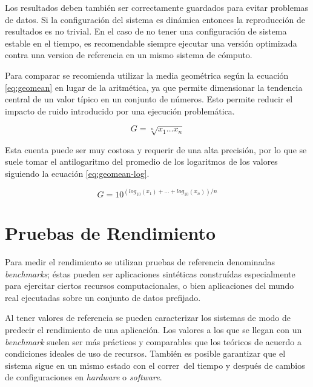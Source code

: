 \documentclass[a4paper]{report}
\begin{document}
Los resultados deben tambi\'en ser correctamente guardados para evitar
problemas de datos. Si la configuraci\'on del sistema es din\'amica entonces la
reproducci\'on de resultados es no trivial. En el caso de no tener una
configuraci\'on de sistema estable en el tiempo, es recomendable siempre
ejecutar una versi\'on optimizada contra una version de referencia en un mismo
sistema de c\'omputo.

\bigskip

Para comparar se recomienda utilizar la media geom\'etrica seg\'un la ecuaci\'on \ref{eq:geomean} en lugar de la aritm\'etica, ya que permite dimensionar la tendencia central de un valor t\'ipico en un conjunto
de n\'umeros. Esto permite reducir el impacto de ruido introducido por una ejecuci\'on
problem\'atica.

\begin{equation}
\label{eq:geomean}
G = \sqrt[n]{x_{1} \ldots x_{n}}
\end{equation}

Esta cuenta puede ser muy costosa y requerir de una alta precisi\'on, por lo que se
suele tomar el antilogaritmo del promedio de los logaritmos de los valores siguiendo
la ecuaci\'on \ref{eq:geomean-log}.

\begin{equation}
\label{eq:geomean-log}
G = 10 ^{( log _{10} (x_{1}) + \ldots + log _{10} (x_{n}) ) / n}
\end{equation}

\bigskip

\section{Pruebas de Rendimiento}

Para medir el rendimiento se utilizan pruebas de referencia denominadas {\em benchmarks}; \'estas pueden ser aplicaciones sint\'eticas constru\'idas especialmente para ejercitar ciertos recursos computacionales, o bien
aplicaciones del mundo real ejecutadas sobre un conjunto de datos prefijado.

\bigskip

Al tener valores de referencia se pueden caracterizar los sistemas de modo de predecir el rendimiento de una aplicaci\'on.
Los valores a los que se llegan con un {\it benchmark} suelen ser m\'as pr\'acticos y
comparables que los te\'oricos de acuerdo a condiciones ideales de uso de recursos.
Tambi\'en es posible garantizar que el sistema sigue en un mismo estado con el correr\
del tiempo y despu\'es de cambios de configuraciones en {\it hardware} o {\it software}.
\end{document}
